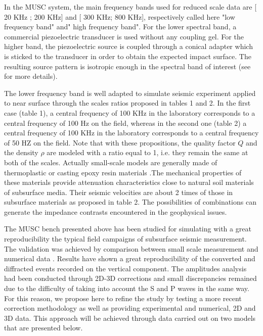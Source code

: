 \documentclass[manuscript,revised]{geophysics}
\begin{document}
\noindent In the MUSC system, the main frequency bands used for reduced scale data are [ 20 KHz ; 200 KHz] and [ 300 KHz; 800 KHz], respectively called here "low frequency band" and" high frequency band". For the lower spectral band, a commercial piezoelectric transducer is used without any coupling gel. For the higher band, the piezoelectric source is coupled through a conical adapter which is sticked to the transducer in order to obtain the expected impact surface. The resulting source pattern is isotropic enough in the spectral band of interest (see \citep{Bretaudeau_SSM_2011} for more details).

\noindent The lower frequency band is well adapted to simulate seismic experiment applied to near surface through the scales ratios proposed in tables 1 and 2. In the first case (table 1), a central frequency of 100 KHz in the laboratory corresponds to a central frequency of 100 Hz on the field, whereas in the second one (table 2) a central frequency of 100 KHz in the laboratory corresponds to a central frequency of 50 HZ on the field. Note that with these propositions, the  quality factor $Q$ and the density $\rho$ are modeled with a ratio equal to 1, i.e. they remain the same at both of the scales. Actually small-scale models are generally made of thermoplastic or casting epoxy resin materials \citep{Bretaudeau_FWI_2013}.The mechanical properties of these materials provide attenuation characteristics close to natural soil materials of subsurface media. Their seismic velocities are about 2 times of those in subsurface materials as proposed in table 2. The possibilities of combinations can generate the impedance contrasts encountered in the geophysical issues. 

\noindent The MUSC bench presented above has been studied for simulating with a great reproducibility the typical field campaigns of subsurface seismic measurement. The validation was achieved by comparison between small scale measurement and numerical data \citep{Bretaudeau_SSM_2011}. Results have shown a great reproducibility of the converted and diffracted events recorded on the vertical component. The amplitudes analysis had been conducted through 2D-3D corrections and small discrepancies remained due to the difficulty of taking into account the S and P waves in the same way. For this reason, we propose here to refine the study by testing a more recent correction methodology \citet{Schafer_LSS_2014} as well as providing experimental and numerical, 2D and 3D data. This approach will be achieved through data carried out on two models that are presented below.
\end{document}
